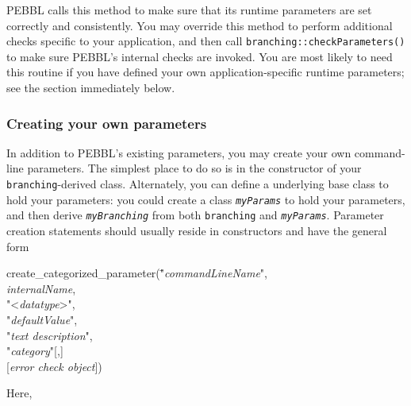  PEBBL calls this method to
make sure that its runtime parameters are set correctly and
consistently.  You may override this method to perform additional
checks specific to your application, and then call
\texttt{branching::checkParameters()} to make sure PEBBL's internal
checks are invoked.  You are most likely to need this routine if you
have defined your own application-specific runtime parameters; see the
section immediately below.

\subsubsection{Creating your own parameters}
\label{sec:ownparams} 
In addition to PEBBL's existing parameters, you may create your own
command-line parameters.  The simplest place to do so is in the
constructor of your \texttt{branching}-derived class.  Alternately,
you can define a underlying base class to hold your parameters: you
could create a class \texttt{\emph{myParams}} to hold your parameters,
and then derive \texttt{\emph{myBranching}} from both
\texttt{branching} and \texttt{\emph{myParams}}.  Parameter creation
statements should usually reside in constructors and have the general
form
\newcommand{\nothing}{}  
\begin{codeblock}
create\_categorized\_parameter(\="\textrm{\emph{commandLineName}}",\\
\>\textrm{\emph{internalName}},\\
\>"\nothing<\textrm{\emph{datatype}}>",\\
\>"\textrm{\emph{defaultValue}}",\\
\>"\textrm{\emph{text description}}",\\
\>"\textrm{\emph{category}}"\textrm{[},\textrm{]}\\
\>\textrm{[\emph{error check object}]})
\end{codeblock}
Here,
